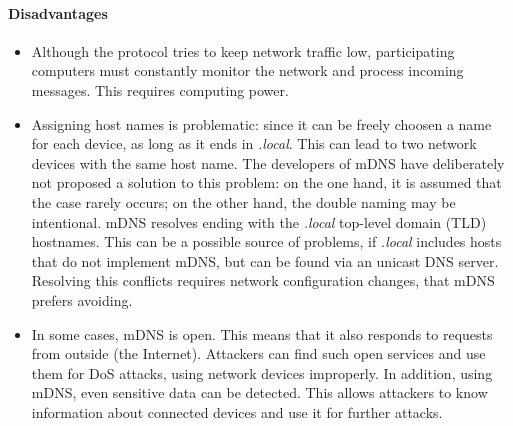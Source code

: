 \documentclass[fleqn, 11pt]{SelfArx} %
\begin{document}
\paragraph{Disadvantages} 
\begin{itemize}[leftmargin=*]
    \item Although the protocol tries to keep network traffic low, participating computers must constantly monitor the network and process incoming messages. This requires computing power.
    \item Assigning host names is problematic: since it can be freely choosen a name for each device, as long as it ends in {\it{.local}}. This can lead to two network devices with the same host name. The developers of mDNS have deliberately not proposed a solution to this problem: on the one hand, it is assumed that the case rarely occurs; on the other hand, the double naming may be intentional. \newline 
    mDNS resolves ending with the {\it{.local}} top-level domain (TLD) hostnames. This can be a possible source of problems, if {\it{.local}} includes hosts that do not implement mDNS, but can be found via an unicast DNS server. Resolving this conflicts requires network configuration changes, that mDNS prefers avoiding.
    \item In some cases, mDNS is open. This means that it also responds to requests from outside (the Internet). Attackers can find such open services and use them for DoS attacks, using network devices improperly. \newline
    In addition, using mDNS, even sensitive data can be detected. This allows attackers to know information about connected devices and use it for further attacks.
\end{itemize}
\end{document}
